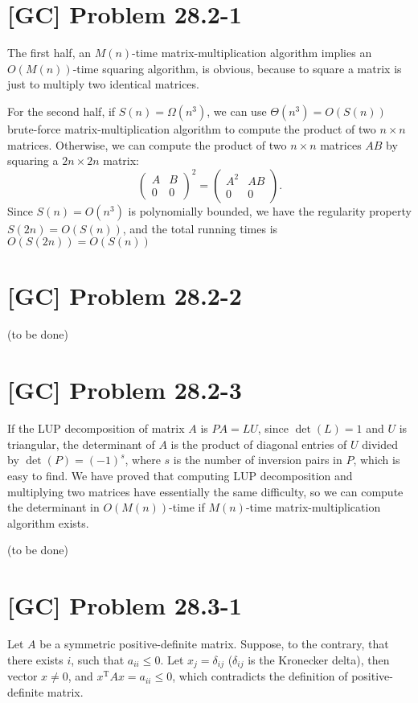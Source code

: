 \documentclass[a4paper,11pt]{article}
\begin{document}
  \section{[GC] Problem 28.2-1}
  The first half, an $M(n)$-time matrix-multiplication algorithm implies an $O(M(n))$-time squaring algorithm, is obvious, because to square a matrix is just to multiply two identical matrices. \par
  For the second half, if $S(n) = \Omega(n^3)$, we can use $\Theta(n^3) = O(S(n))$ brute-force matrix-multiplication algorithm to compute the product of two $n \times n$ matrices. Otherwise, we can compute the product of two $n \times n$ matrices $AB$ by squaring a $2n \times 2n$ matrix:
  $$ \begin{pmatrix} A & B \\ 0 & 0 \end{pmatrix}^2
     =
     \begin{pmatrix} A^2 & AB \\ 0 & 0 \end{pmatrix}. $$
  Since $S(n) = O(n^3)$ is polynomially bounded, we have the regularity property $S(2n) = O(S(n))$, and the total running times is $O(S(2n)) = O(S(n))$

  \section{[GC] Problem 28.2-2}
  (to be done)

  \section{[GC] Problem 28.2-3}
  If the LUP decomposition of matrix $A$ is $PA = LU$, since $\det(L) = 1$ and $U$ is triangular, the determinant of $A$ is the product of diagonal entries of $U$ divided by $\det(P) = (-1)^s$, where $s$ is the number of inversion pairs in $P$, which is easy to find. We have proved that computing LUP decomposition and multiplying two matrices have essentially the same difficulty, so we can compute the determinant in $O(M(n))$-time if $M(n)$-time matrix-multiplication algorithm exists. \par
  (to be done)

  \section{[GC] Problem 28.3-1}
  Let $A$ be a symmetric positive-definite matrix. Suppose, to the contrary, that there exists $i$, such that $a_{ii} \leq 0$. Let $x_j = \delta_{ij}$ ($\delta_{ij}$ is the Kronecker delta), then vector $x \neq 0$, and $x^{\text{T}}Ax = a_{ii} \leq 0$, which contradicts the definition of positive-definite matrix.
\end{document}
